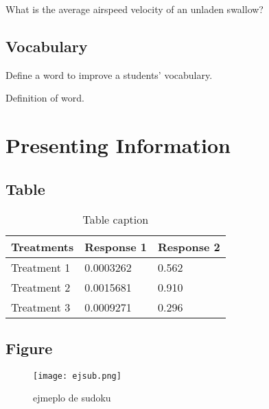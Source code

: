 \documentclass[11pt,fleqn]{book} %
\begin{document}
\begin{problem}
What is the average airspeed velocity of an unladen swallow?
\end{problem}


\section{Vocabulary}

Define a word to improve a students' vocabulary.

\begin{vocabulary}[Word]
Definition of word.
\end{vocabulary}



\chapter{Presenting Information}

\section{Table}

\begin{table}[h]
\centering
\begin{tabular}{l l l}
\toprule
\textbf{Treatments} & \textbf{Response 1} & \textbf{Response 2}\\
\midrule
Treatment 1 & 0.0003262 & 0.562 \\
Treatment 2 & 0.0015681 & 0.910 \\
Treatment 3 & 0.0009271 & 0.296 \\
\bottomrule
\end{tabular}
\caption{Table caption}
\end{table}


\section{Figure}

\begin{figure}[h]
\centering\texttt{[image: ejsub.png]}
\caption{ejmeplo de sudoku}
\end{figure}
\end{document}
